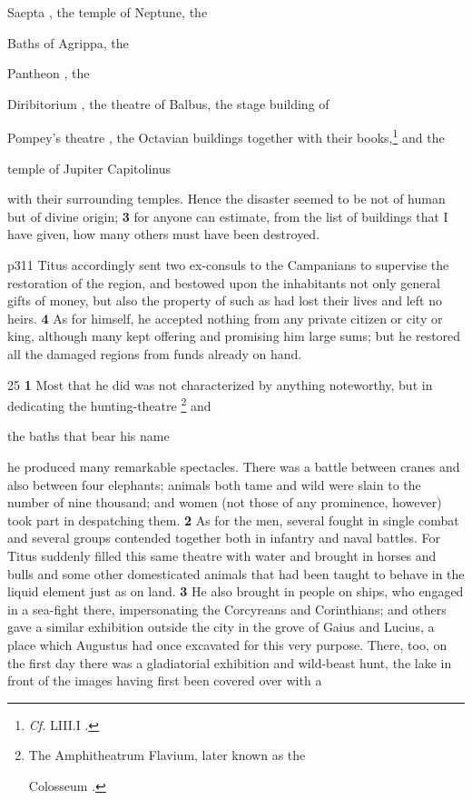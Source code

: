 Saepta , the temple of Neptune, the

Baths of Agrippa, the

Pantheon , the

Diribitorium , the theatre of Balbus, the stage building of

Pompey's theatre , the Octavian buildings together with their books,\texthebrew{⁠}\footnote{\emph{Cf.} LIII.I .

} and the

temple of Jupiter Capitolinus

with their surrounding temples. Hence the disaster seemed to be not of human but of divine origin; \textbf{3} for anyone can estimate, from the list of buildings that I have given, how many others must have been destroyed.

p311
Titus accordingly sent two ex-consuls to the Campanians to supervise the restoration of the region, and bestowed upon the inhabitants not only general gifts of money, but also the property of such as had lost their lives and left no heirs. \textbf{4} As for himself, he accepted nothing from any private citizen or city or king, although many kept offering and promising him large sums; but he restored all the damaged regions from funds already on hand.

25
\textbf{1} Most that he did was not characterized by anything noteworthy, but in dedicating the hunting-theatre \texthebrew{⁠}\footnote{The Amphitheatrum Flavium, later known as the

Colosseum .

} and

the baths that bear his name

he produced many remarkable spectacles. There was a battle between cranes and also between four elephants; animals both tame and wild were slain to the number of nine thousand; and women (not those of any prominence, however) took part in despatching them. \textbf{2} As for the men, several fought in single combat and several groups contended together both in infantry and naval battles. For Titus suddenly filled this same theatre with water and brought in horses and bulls and some other domesticated animals that had been taught to behave in the liquid element just as on land. \textbf{3} He also brought in people on ships, who engaged in a sea-fight there, impersonating the Corcyreans and Corinthians; and others gave a similar exhibition outside the city in the grove of Gaius and Lucius, a place which Augustus had once excavated for this very purpose. There, too, on the first day there was a gladiatorial exhibition and wild-beast hunt, the lake in front of the images having first been covered over with a

